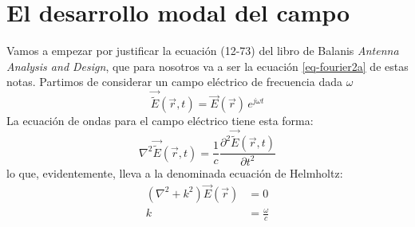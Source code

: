 \documentclass[twocolumn,tikz]{handout}
\begin{document}
\maketitleinst

\section{El desarrollo modal del campo}
Vamos a empezar por justificar la ecuación (12-73) del libro de
Balanis \textit{Antenna Analysis and Design}, que para nosotros va a
ser la ecuación \eqref{eq-fourier2a} de estas notas. Partimos de
considerar un campo eléctrico de frecuencia dada $\omega$
\begin{equation}
\vec{\tilde{E}}(\vec{r},t)=\vec{E}(\vec{r})\,e^{j\omega t}
\label{eq-Ert}
\end{equation}
La ecuación de ondas para el campo eléctrico tiene esta forma:
\begin{equation}
\nabla^{2} \vec{\tilde{E}}(\vec{r},t)=\frac{1}{c}\frac{\partial^{2}
\vec{\tilde{E}}(\vec{r},t)}{\partial t^{2}}
\label{eq-we}
\end{equation}
lo que, evidentemente, lleva a la denominada ecuación de Helmholtz:
\begin{subequations}
\begin{align}
(\nabla^{2}+k^{2})\vec{E}(\vec{r})&=0\nonumber
\\
k&=\frac{\omega}{c}
\label{eq-He}
\end{align}
\end{subequations}
\end{document}
